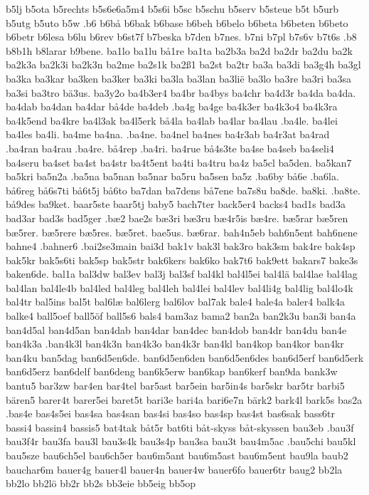 b5lj
b5ota
b5rechts
b5s6e6a5m4
b5s6i
b5sc
b5schu
b5serv
b5steue
b5t
b5urb
b5utg
b5uto
b5w
.b6
b6bå
b6bak
b6base
b6beh
b6belo
b6beta
b6beten
b6beto
b6betr
b6lesa
b6lu
b6rev
b6st7f
b7beska
b7den
b7nes.
b7ni
b7pl
b7s6v
b7t6s
.b8
b8b1h
b8larar
b9bene.
ba1lo
ba1lu
bå1re
ba1ta
ba2b3a
ba2d
ba2dr
ba2du
ba2k
ba2k3a
ba2k3i
ba2k3n
ba2me
ba2s1k
ba2ß1
ba2st
ba2tr
ba3a
ba3di
ba3g4h
ba3gl
ba3ka
ba3kar
ba3ken
ba3ker
ba3ki
ba3la
ba3lan
ba3lië
ba3lo
ba3re
ba3ri
ba3sa
ba3si
ba3tro
bä3us.
ba3y2o
ba4b3er4
ba4br
ba4bys
ba4chr
ba4d3r
ba4da
ba4da.
ba4dab
ba4dan
ba4dar
bå4de
ba4deb
.ba4g
ba4ge
ba4k3er
ba4k3o4
ba4k3ra
ba4k5end
ba4kre
ba4l3ak
ba4l5erk
bå4la
ba4lab
ba4lar
ba4lau
.ba4le.
ba4lei
ba4les
ba4li.
ba4me
ba4na.
.ba4ne.
ba4nel
ba4nes
ba4r3ab
ba4r3at
ba4rad
.ba4ran
ba4rau
.ba4re.
bå4rep
.ba4ri.
ba4rue
bå4s3te
ba4se
ba4seb
ba4seli4
ba4seru
ba4set
ba4st
ba4str
ba4t5ent
ba4ti
ba4tru
ba4z
ba5cl
ba5den.
ba5kan7
ba5kri
ba5n2a
.ba5na
ba5nan
ba5nar
ba5ru
ba5sen
ba5z
.ba6by
bå6e
.ba6la.
bå6reg
bå6s7ti
bå6t5j
bå6to
ba7dan
ba7dens
bå7ene
ba7s8u
ba8de.
ba8ki.
.ba8te.
bå9des
ba9ket.
baar5ste
baar5tj
baby5
bach7ter
back5er4
backs4
bad1s
bad3a
bad3ar
bad3s
bad5ger
.bæ2
bae2s
bæ3ri
bæ3ru
bæ4r5is
bæ4re.
bæ5rar
bæ5ren
bæ5rer.
bæ5rere
bæ5res.
bæ5ret.
bae5us.
bæ6rar.
bah4n5eb
bah6n5ent
bah6nene
bahne4
.bahner6
.bai2se3main
bai3d
bak1v
bak3l
bak3ro
bak3sm
bak4re
bak4sp
bak5kr
bak5s6ti
bak5sp
bak5str
bak6kers
bak6ko
bak7t6
bak9ett
bakars7
bake3s
baken6de.
bal1a
bal3dw
bal3ev
bal3j
bal3sf
bal4kl
bal4l5ei
bal4lä
bal4lae
bal4lag
bal4lan
bal4le4b
bal4led
bal4leg
bal4leh
bal4lei
bal4lev
bal4li4g
bal4lig
bal4lo4k
bal4tr
bal5ins
bal5t
bal6læ
bal6lerg
bal6lov
bal7ak
bale4
bale4a
baler4
balk4a
balke4
ball5oef
ball5öf
ball5s6
bals4
bam3az
bama2
ban2a
ban2k3u
ban3i
ban4a
ban4d5al
ban4d5an
ban4dab
ban4dar
ban4dec
ban4dob
ban4dr
ban4du
ban4e
ban4k3a
.ban4k3l
ban4k3n
ban4k3o
ban4k3r
ban4kl
ban4kop
ban4kor
ban4kr
ban4ku
ban5dag
ban6d5en6de.
ban6d5en6den
ban6d5en6des
ban6d5erf
ban6d5erk
ban6d5erz
ban6delf
ban6deng
ban6k5erw
ban6kap
ban6kerf
ban9da
bank3w
bantu5
bar3zw
bar4en
bar4tel
bar5ast
bar5ein
bar5in4s
bar5skr
bar5tr
barbi5
bären5
barer4t
barer5ei
baret5t
bari3e
bari4a
bari6e7n
bärk2
bark4l
bark5s
bas2a
.bas4e
bas4s5ei
bas4sa
bas4san
bas4si
bas4so
bas4sp
bas4st
bas6sak
bass6tr
bassi4
bassin4
bassis5
bat4tak
båt5r
bat6ti
båt-skyss
båt-skyssen
bau3eb
.bau3f
bau3f4r
bau3fa
bau3l
bau3s4k
bau3s4p
bau3sa
bau3t
bau4m5ac
.bau5chi
bau5kl
bau5sze
bau6ch5el
bau6ch5er
bau6m5ant
bau6m5ast
bau6m5ent
bau9la
baub2
bauchar6m
bauer4g
bauer4l
bauer4n
bauer4w
bauer6fo
bauer6tr
baug2
bb2la
bb2lo
bb2lö
bb2r
bb2s
bb3eie
bb5eig
bb5op
